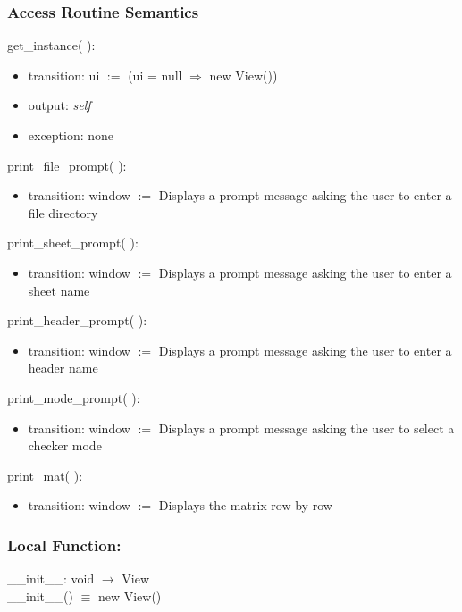 \documentclass[12pt]{article}
\begin{document}
\subsubsection* {Access Routine Semantics}

\noindent get\_instance( ):
\begin{itemize}
\item transition: ui $:=$ (ui = null $\Rightarrow$ new View())
\item output: \textit{self}
\item exception: none
\end{itemize}

\noindent print\_file\_prompt( ):
\begin{itemize}
\item transition: window $:=$ Displays a prompt message asking the user to enter a file directory
\end{itemize}

\noindent print\_sheet\_prompt( ):
\begin{itemize}
\item transition: window $:=$ Displays a prompt message asking the user to enter a sheet name
\end{itemize}

\noindent print\_header\_prompt( ):
\begin{itemize}
\item transition: window $:=$ Displays a prompt message asking the user to enter a header name
\end{itemize}

\noindent print\_mode\_prompt( ):
\begin{itemize}
\item transition: window $:=$ Displays a prompt message asking the user to select a checker mode
\end{itemize}

\noindent print\_mat( ):
\begin{itemize}
\item transition: window $:=$ Displays the matrix row by row
\end{itemize}

\subsubsection*{Local Function:}

\_\_init\_\_: void $\rightarrow$ View \\
\_\_init\_\_() $\equiv$ new View()
\end{document}
